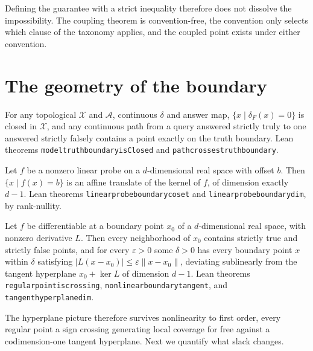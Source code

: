 \documentclass[mlmain,onecolumn]{jmlr}
\newcommand{\X}{\mathcal{X}}
\newcommand{\A}{\mathcal{A}}
\newcommand{\dF}{\delta_{\!F}}
\newcommand{\leanid}[1]{{\def\_{\textunderscore\allowbreak}\texttt{#1}}}
\begin{document}
Defining the guarantee with a strict inequality therefore does not
dissolve the impossibility. The coupling theorem is convention-free,
the convention only selects which clause of the taxonomy applies,
and the coupled point exists under either convention.

\section{The geometry of the boundary}
\label{sec:geometry}

\begin{theorem}
\label{thm:closed}
For any topological $\X$ and $\A$, continuous $\delta$ and answer
map, $\{x \mid \dF(x) = 0\}$ is closed in $\X$, and any continuous
path from a query answered strictly truly to one answered strictly
falsely contains a point exactly on the truth boundary. Lean
theorems \leanid{model\_truth\_boundary\_isClosed} and
\leanid{path\_crosses\_truth\_boundary}.
\end{theorem}

\begin{theorem}
\label{thm:hyperplane}
Let $f$ be a nonzero linear probe on a $d$-dimensional real space
with offset $b$. Then $\{x \mid f(x) = b\}$ is an affine translate
of the kernel of $f$, of dimension exactly $d - 1$. Lean theorems
\leanid{linear\_probe\_boundary\_coset} and
\leanid{linear\_probe\_boundary\_dim}, by rank-nullity.
\end{theorem}

\begin{theorem}
\label{thm:nonlinear}
Let $f$ be differentiable at a boundary point $x_0$ of a
$d$-dimensional real space, with nonzero derivative $L$. Then every neighborhood of $x_0$ contains strictly
true and strictly false points, and for every $\varepsilon > 0$
some $\delta > 0$ has every boundary point $x$ within $\delta$
satisfying $|L(x - x_0)| \le \varepsilon \|x - x_0\|$, deviating
sublinearly from the tangent hyperplane $x_0 + \ker L$ of dimension
$d - 1$. Lean theorems \leanid{regular\_point\_is\_crossing},
\leanid{nonlinear\_boundary\_tangent}, and
\leanid{tangent\_hyperplane\_dim}.
\end{theorem}

The hyperplane picture therefore survives nonlinearity to first
order, every regular point a sign crossing generating local coverage
for free against a codimension-one tangent hyperplane. Next we
quantify what slack changes.
\end{document}
